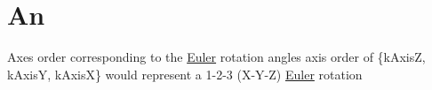 \hypertarget{_an-example}{}\section{An}
Axes order corresponding to the \mbox{\hyperlink{class_euler}{Euler}} rotation angles axis order of \{k\+AxisZ, k\+AxisY, k\+AxisX\} would represent a 1-\/2-\/3 (X-\/\+Y-\/Z) \mbox{\hyperlink{class_euler}{Euler}} rotation


\begin{DoxyCodeInclude}{0}
\end{DoxyCodeInclude}
 